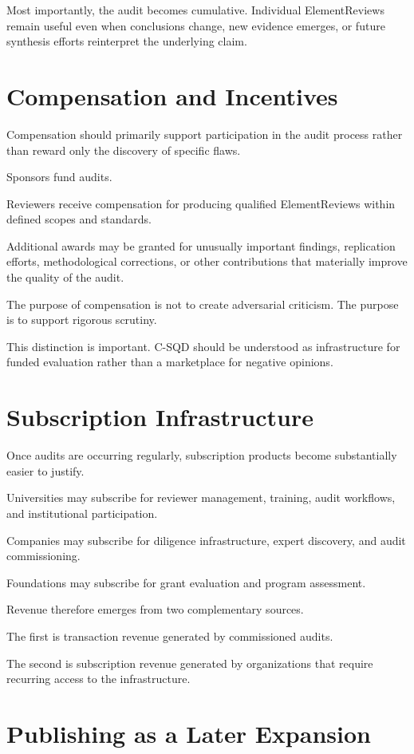 \documentclass[11pt]{article}
\begin{document}
Most importantly, the audit becomes cumulative. Individual ElementReviews remain useful even when conclusions change, new evidence emerges, or future synthesis efforts reinterpret the underlying claim.

\section{Compensation and Incentives}

Compensation should primarily support participation in the audit process rather than reward only the discovery of specific flaws.

Sponsors fund audits.

Reviewers receive compensation for producing qualified ElementReviews within defined scopes and standards.

Additional awards may be granted for unusually important findings, replication efforts, methodological corrections, or other contributions that materially improve the quality of the audit.

The purpose of compensation is not to create adversarial criticism. The purpose is to support rigorous scrutiny.

This distinction is important. C-SQD should be understood as infrastructure for funded evaluation rather than a marketplace for negative opinions.

\section{Subscription Infrastructure}

Once audits are occurring regularly, subscription products become substantially easier to justify.

Universities may subscribe for reviewer management, training, audit workflows, and institutional participation.

Companies may subscribe for diligence infrastructure, expert discovery, and audit commissioning.

Foundations may subscribe for grant evaluation and program assessment.

Revenue therefore emerges from two complementary sources.

The first is transaction revenue generated by commissioned audits.

The second is subscription revenue generated by organizations that require recurring access to the infrastructure.

\section{Publishing as a Later Expansion}
\end{document}
